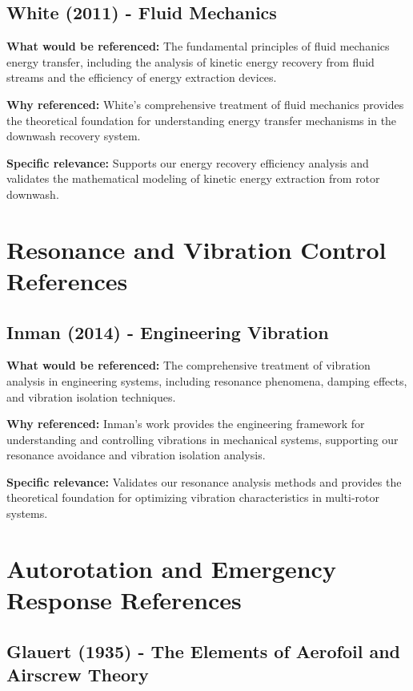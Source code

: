 \documentclass{article}
\begin{document}
\subsection{White (2011) - Fluid Mechanics}

\textbf{What would be referenced:} The fundamental principles of fluid mechanics energy transfer, including the analysis of kinetic energy recovery from fluid streams and the efficiency of energy extraction devices.

\textbf{Why referenced:} White's comprehensive treatment of fluid mechanics provides the theoretical foundation for understanding energy transfer mechanisms in the downwash recovery system.

\textbf{Specific relevance:} Supports our energy recovery efficiency analysis and validates the mathematical modeling of kinetic energy extraction from rotor downwash.

\section{Resonance and Vibration Control References}

\subsection{Inman (2014) - Engineering Vibration}

\textbf{What would be referenced:} The comprehensive treatment of vibration analysis in engineering systems, including resonance phenomena, damping effects, and vibration isolation techniques.

\textbf{Why referenced:} Inman's work provides the engineering framework for understanding and controlling vibrations in mechanical systems, supporting our resonance avoidance and vibration isolation analysis.

\textbf{Specific relevance:} Validates our resonance analysis methods and provides the theoretical foundation for optimizing vibration characteristics in multi-rotor systems.

\section{Autorotation and Emergency Response References}

\subsection{Glauert (1935) - The Elements of Aerofoil and Airscrew Theory}
\end{document}
